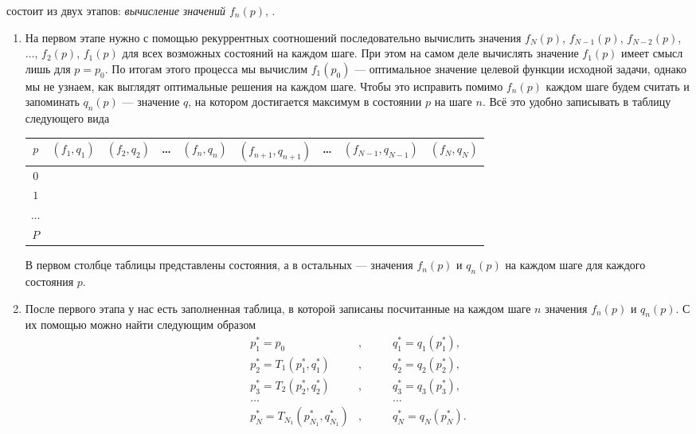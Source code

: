 \underline{} состоит из двух этапов: \textit{вычисление значений $f_n(p)$}, .

\begin{enumerate}[nosep]
	\item[\fbox{Этап 1}] На первом этапе нужно с помощью рекуррентных соотношений последовательно вычислить значения $f_N(p)$, $f_{N-1}(p)$, $f_{N-2}(p)$, $\dots$, $f_2(p)$, $f_1(p)$ для всех возможных состояний на каждом шаге. При этом на самом деле вычислять значение $f_1(p)$ имеет смысл лишь для $p = p_0$. По итогам этого процесса мы вычислим $f_1(p_0)$ --- оптимальное значение целевой функции исходной задачи, однако мы не узнаем, как выглядят оптимальные решения на каждом шаге. Чтобы это исправить помимо $f_n(p)$ каждом шаге будем считать и запоминать $q_n(p)$ --- значение $q$, на котором достигается максимум в состоянии $p$ на шаге $n$. Всё это удобно записывать в таблицу следующего вида
	
	\begin{table}[H]
		\centering
		\begin{tabular}{ | c | c | c | c | c | c | c | c | c | } 
			\hline
			$p$ & $(f_1, q_1)$ & $(f_2, q_2)$ & \dots & $(f_n, q_n)$ & $(f_{n+1}, q_{n+1})$ & \dots & $(f_{N-1}, q_{N-1})$ & $(f_N, q_N)$ \\ 
			\hline
			$0$ & & & & & & & & \\\hline
			$1$ & & & & & & & & \\\hline
			$\dots$ & & & & & & & & \\\hline
			$P$ & & & & & & & & \\\hline
		\end{tabular}
	\end{table}
	
	В первом столбце таблицы представлены состояния, а в остальных --- значения $f_n(p)$ и $q_n(p)$ на каждом шаге для каждого состояния $p$.
	
	\item[\fbox{Этап 2}] После первого этапа у нас есть заполненная таблица, в которой записаны посчитанные на каждом шаге $n$ значения $f_n(p)$ и $q_n(p)$. С их помощью можно найти \underline{} следующим образом
	\begin{align*}
		p_1^* = p_0&, \qquad &q_1^* = q_1(p_1^*), \\
		p_2^* = T_1(p_1^*, q_1^*)&, &q_2^* = q_2(p_2^*), \\
		p_3^* = T_2(p_2^*, q_2^*)&, &q_3^* = q_3(p_3^*), \\
		\dots& &\dots \\
		p_N^* = T_{N_1}(p_{N_1}^*, q_{N_1}^*)&, &q_N^* = q_N(p_N^*).
	\end{align*}
\end{enumerate}

